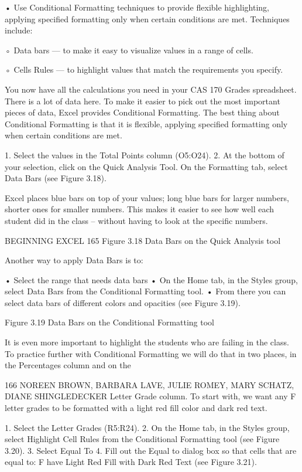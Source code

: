 • Use Conditional Formatting techniques to provide flexible highlighting, applying specified formatting only
when certain conditions are met. Techniques include:

◦ Data bars — to make it easy to visualize values in a range of cells.

◦ Cells Rules — to highlight values that match the requirements you specify.



You now have all the calculations you need in your CAS 170 Grades spreadsheet. There is a lot of
data here. To make it easier to pick out the most important pieces of data, Excel provides Conditional
Formatting. The best thing about Conditional Formatting is that it is flexible, applying specified
formatting only when certain conditions are met.

1. Select the values in the Total Points column (O5:O24).
2. At the bottom of your selection, click on the Quick Analysis Tool. On the Formatting tab, select
Data Bars (see Figure 3.18).

Excel places blue bars on top of your values; long blue bars for larger numbers, shorter ones for
smaller numbers. This makes it easier to see how well each student did in the class – without having
to look at the specific numbers.




BEGINNING EXCEL 165
Figure 3.18 Data Bars on the Quick Analysis tool


Another way to apply Data Bars is to:

• Select the range that needs data bars
• On the Home tab, in the Styles group, select Data Bars from the Conditional Formatting tool.
• From there you can select data bars of different colors and opacities (see Figure 3.19).




Figure 3.19 Data Bars on the Conditional Formatting tool


It is even more important to highlight the students who are failing in the class. To practice further
with Conditional Formatting we will do that in two places, in the Percentages column and on the


166 NOREEN BROWN, BARBARA LAVE, JULIE ROMEY, MARY SCHATZ, DIANE SHINGLEDECKER
Letter Grade column. To start with, we want any F letter grades to be formatted with a light red fill
color and dark red text.

1. Select the Letter Grades (R5:R24).
2. On the Home tab, in the Styles group, select Highlight Cell Rules from the Conditional
Formatting tool (see Figure 3.20).
3. Select Equal To
4. Fill out the Equal to dialog box so that cells that are equal to: F have Light Red Fill with Dark
Red Text (see Figure 3.21).




